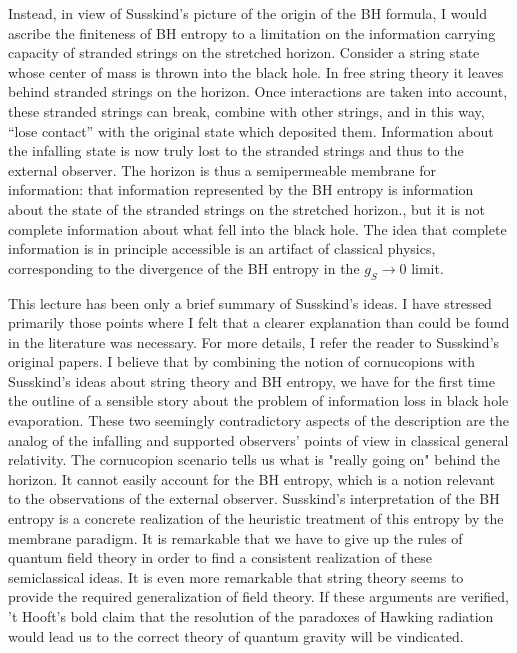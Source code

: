Instead, in view of Susskind's picture of the origin of the BH formula,
I would ascribe the finiteness of BH entropy to a limitation on the
information carrying capacity of stranded strings on the stretched
horizon.  Consider a string state whose center of mass is thrown into
the black hole.  In free string theory it leaves behind stranded strings
on the horizon.  Once interactions are taken into account, these
stranded strings
can break, combine with other strings, and in this way, ``lose contact''
with the original state which deposited them.  Information about the
infalling state is now truly lost to the stranded strings and thus to
the external observer.  The horizon is thus a semipermeable membrane for
information:  that information represented by the BH entropy is
information about the state of the stranded strings on the stretched
horizon., but it is not complete information about what fell into the
black hole.  The idea that complete information is in principle
accessible is an artifact of classical physics, corresponding to the
divergence of the BH entropy in the $g_S \rightarrow 0$ limit.

This lecture has been only a brief summary of Susskind's ideas.  I have
stressed
primarily those points where I felt that a clearer explanation than
could be found in the literature was necessary.  For more details, I refer
the reader to Susskind's original papers.
I believe that by combining the notion of cornucopions with Susskind's ideas
about string theory and BH entropy, we have for the first time the outline
of a sensible story about the problem of information loss in black hole
evaporation.
These two seemingly contradictory aspects of the description are the analog
of the infalling and supported observers' points of view
in classical general relativity.  The cornucopion scenario tells us what
is "really going on" behind the horizon.  It cannot easily account for
the BH entropy, which is a notion relevant to the observations of the
external observer.  Susskind's interpretation of
the BH entropy is a concrete realization of the heuristic treatment of
this entropy by the membrane paradigm.  It is remarkable that we have to
give up the rules of quantum field theory in order to find a consistent
realization of these semiclassical ideas.  It is even more remarkable
that string theory seems to provide the required generalization of field
theory.  If these arguments are verified, 't Hooft's bold claim that the
resolution of the paradoxes of Hawking radiation would lead us to the
correct theory of quantum gravity will be vindicated.

